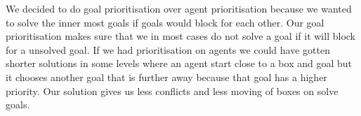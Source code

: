 
We decided to do goal prioritisation over agent prioritisation because we wanted to solve the inner most goals if goals would block for each other.
Our goal prioritisation makes sure that we in most cases do not solve a goal if it will block for a unsolved goal.
If we had prioritisation on agents we could have gotten shorter solutions in some levels where an agent start close to a box and goal but it chooses another goal that is further away because that goal has a higher priority.
Our solution gives us less conflicts and less moving of boxes on solve goals.

